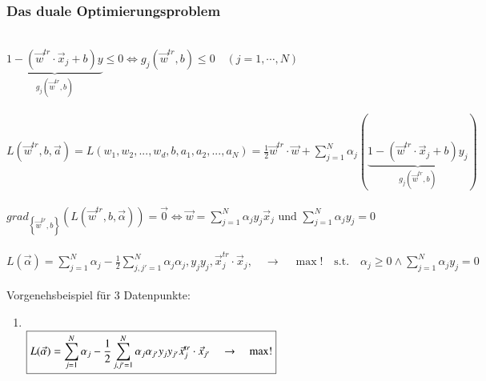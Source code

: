 \subsubsection{Das duale Optimierungsproblem}
\\
$\boxed{\underbrace{1-\left(\vec{w}^{tr}\cdot\vec{x}_j+b\right)y}_{g_j(\vec{w}^{tr},b)}\leq0\Leftrightarrow g_j(\vec{w}^{tr},b)\leq0\quad\left(j=1,\cdots,N\right)}$\\
\\
$\boxed{L(\vec{w}^{tr},b,\vec{a})=L(w_1,w_2, ...,w_d,b,a_1,a_2, ...,a_N)=\frac12\vec{w}^{tr}\cdot\vec{w}+\sum_{j=1}^N\alpha_j\left(\underbrace{1-\left(\vec{w}^{tr}\cdot\vec{x}_j+b\right)y_j}_{g_j\left(\vec{w}^{tr},b\right)}\right)}$\\
\\
$\boxed{grad_{\left\{\vec{w}^{tr},b\right\}}\left(L(\vec{w}^{tr},b,\vec{\alpha})\right)=\vec{0}} \Leftrightarrow 
\boxed{\vec{w}=\sum_{j=1}^N\alpha_jy_j\vec{x}_j} \text{ und }
\boxed{\sum_{j=1}^N\alpha_jy_j=0}$\\
\\
$\boxed{L(\vec{\alpha})=\sum_{j=1}^N\alpha_j-\frac12\sum_{j,j'=1}^N\alpha_j\alpha_j, y_jy_j, \vec{x}_j^{tr}\cdot\vec{x}_j,\quad\to\quad\max!\quad\mathrm{s.t.}\quad\alpha_j\geq0\wedge\sum_{j=1}^N\alpha_jy_j=0}$\\

\newcolumn
{}\\
Vorgenehsbeispiel für 3 Datenpunkte:
\begin{enumerate}
    \item {}\\
    $\boxed{L(\vec{\alpha})=\sum_{j=1}^N\alpha_j-\frac{1}{2}\sum_{j,j'=1}^N\alpha_j\alpha_{j'} \space y_jy_{j'} \space \vec{x}_j^{tr}\cdot\vec{x}_{j'}\quad\to\quad\max!}$\\
\end{enumerate}

